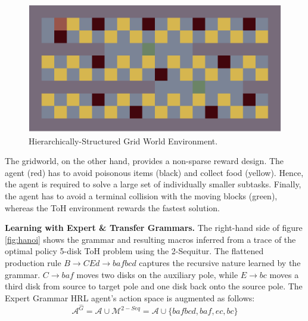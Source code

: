 \documentclass[10pt,letterpaper]{article}
\begin{document}
 \begin{figure}[H]
    \centering
    \includegraphics[width=0.75\linewidth]{figures/gridworld}
    \caption{Hierarchically-Structured Grid World Environment.}
    \label{fig:gridworld}
 \end{figure}
 
The gridworld, on the other hand, provides a non-sparse reward design. The agent (red) has to avoid poisonous items (black) and collect food (yellow). Hence, the agent is required to solve a large set of individually smaller subtasks. Finally, the agent has to avoid a terminal collision with the moving blocks (green), whereas the ToH environment rewards the fastest solution. 
 
\textbf{Learning with Expert \& Transfer Grammars.} The right-hand side of figure \ref{fig:hanoi} shows the grammar and resulting macros inferred from a trace of the optimal policy 5-disk ToH problem using the 2-Sequitur. The flattened production rule $B \to CEd \to bafbcd$ captures the recursive nature learned by the grammar. $C \to baf$ moves two disks on the auxiliary pole, while $E \to bc$ moves a third disk from source to target pole and one disk back onto the source pole. The Expert Grammar HRL agent's action space is augmented as follows:
$$\mathcal{A}^{\hat{G}} = \mathcal{A} \cup \mathcal{M}^{2-Seq} = \mathcal{A} \cup \{bafbcd, baf, ec, bc\}$$
\end{document}
